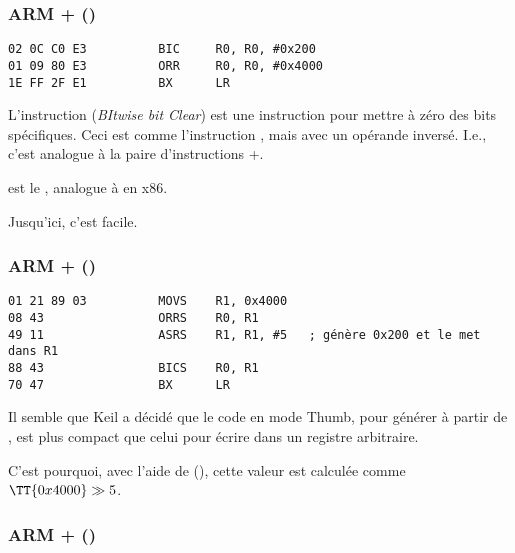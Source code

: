 \subsubsection{ARM + \OptimizingKeilVI (\ARMMode)}

\begin{lstlisting}[caption=\OptimizingKeilVI (\ARMMode),style=customasmARM]
02 0C C0 E3          BIC     R0, R0, #0x200
01 09 80 E3          ORR     R0, R0, #0x4000
1E FF 2F E1          BX      LR
\end{lstlisting}

L'instruction  (\emph{BItwise bit Clear}) est une instruction pour mettre
à zéro des bits spécifiques. Ceci est comme l'instruction \AND, mais avec un opérande
inversé. I.e., c'est analogue à la paire d'instructions \NOT+\AND.

 est le , analogue à \OR en x86.

Jusqu'ici, c'est facile.

\subsubsection{ARM + \OptimizingKeilVI (\ThumbMode)}

\begin{lstlisting}[caption=\OptimizingKeilVI (\ThumbMode),style=customasmARM]
01 21 89 03          MOVS    R1, 0x4000
08 43                ORRS    R0, R1
49 11                ASRS    R1, R1, #5   ; génère 0x200 et le met dans R1
88 43                BICS    R0, R1
70 47                BX      LR
\end{lstlisting}

Il semble que Keil a décidé que le code en mode Thumb, pour générer  à
partir de , est plus compact que celui pour écrire  dans un
registre arbitraire.


C'est pourquoi, avec l'aide de  (\ASRdesc), cette valeur est calculée comme
$\TT{0x4000} \gg 5$.

\subsubsection{ARM + \OptimizingXcodeIV (\ARMMode)}
\label{anomaly:LLVM}
\myindex{\CompilerAnomaly}

